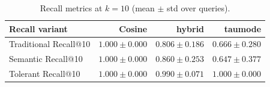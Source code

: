 \begin{table}[h]
\centering
\caption{Recall metrics at $k=10$ (mean $\pm$ std over queries).}
\begin{tabular}{lrrr}
\toprule
Recall variant & Cosine & hybrid & taumode \\
\midrule
Traditional Recall@10 & $\mathbf{1.000\pm0.000}$ & $0.806\pm0.186$ & $0.666\pm0.280$ \\
Semantic Recall@10 & $\mathbf{1.000\pm0.000}$ & $0.860\pm0.253$ & $0.647\pm0.377$ \\
Tolerant Recall@10 & $\mathbf{1.000\pm0.000}$ & $0.990\pm0.071$ & $\mathbf{1.000\pm0.000}$ \\
\bottomrule
\end{tabular}
\end{table}
